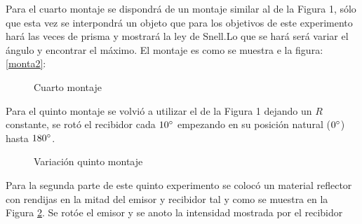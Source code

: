 \documentclass[aps,prl,reprint]{revtex4-1}
\begin{document}
Para el cuarto montaje se dispondrá de un montaje similar al de la Figura 1, sólo que esta vez se interpondrá un objeto que para los objetivos de este experimento hará las veces de prisma y mostrará la ley de Snell.Lo que se hará será variar el ángulo y encontrar el máximo. El montaje es como se muestra e la figura:
\ref{monta2}:\\
\begin{figure}[H]
\begin{center}
 \caption{Cuarto montaje}
 \label{monta3}
 \end{center}
\end{figure}

Para el quinto montaje se volvi\'o a utilizar el de la Figura 1 dejando un $R$ constante,  se rot\'o el recibidor cada $10\degree$ empezando en su posición natural ($0\degree$) hasta $180\degree$.

\begin{figure}[H]
\begin{center}
 \caption{Variaci\'on quinto montaje}
 \label{exp5}
 \end{center}
\end{figure}

Para la segunda parte de este quinto experimento se coloc\'o un material reflector con rendijas en la mitad del emisor y recibidor tal y como se muestra en la Figura \ref{exp5}. Se rot\'oe el emisor y se anoto la intensidad mostrada por el recibidor\\
\end{document}
